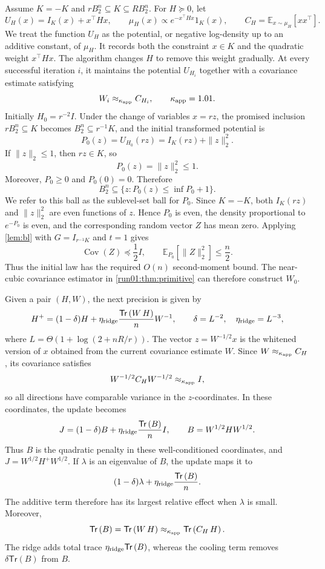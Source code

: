 \documentclass[11pt]{article}
\numberwithin{equation}{section}
\theoremstyle{definition}
\newcommand{\E}[2]{\mathbb{E}_{#1}\left[#2\right]}
\newcommand{\Tr}[1]{\mathsf{Tr}\left(#1\right)}
\begin{document}
Assume $K=-K$ and
$rB_2^n\subseteq K\subseteq RB_2^n$.
For $H\succeq0$, let
\[
U_H(x)=I_K(x)+x^\top Hx,
\qquad
\mu_H(x)\propto e^{-x^\top Hx}1_K(x),
\qquad
C_H=\E{x\sim\mu_H}{xx^\top}.
\]
We treat the function $U_H$ as the potential, or negative log-density up to an
additive constant, of
$\mu_H$.
It records both the constraint $x\in K$ and the quadratic weight
$x^\top Hx$.
The algorithm changes $H$ to remove this weight gradually.
At every successful iteration $i$, it maintains the potential
$U_{H_i}$ together with a covariance estimate satisfying
\[
W_i\approx_{\kappa_{\rm app}}C_{H_i},
\qquad
\kappa_{\rm app}=1.01.
\]
Initially $H_0=r^{-2}I$.
Under the change of variables $x=rz$, the promised inclusion
$rB_2^n\subseteq K$ becomes
$B_2^n\subseteq r^{-1}K$, and the initial transformed potential is
\[
P_0(z)
=U_{H_0}(rz)
=I_K(rz)+\|z\|_2^2.
\]
If $\|z\|_2\leq1$, then
$rz\in K$, so
\[
P_0(z)
=\|z\|_2^2
\leq1.
\]
Moreover, $P_0\geq0$ and
$P_0(0)=0$.
Therefore
\[
 B_2^n\subseteq\{z:P_0(z)\leq\inf P_0+1\}.
\]
We refer to this ball as the sublevel-set ball for $P_0$.
Since $K=-K$, both
$I_K(rz)$ and
$\|z\|_2^2$ are even functions of
$z$.
Hence $P_0$ is even, the density proportional to
$e^{-P_0}$ is even, and the corresponding random vector
$Z$ has mean zero.
Applying \cref{lem:bl} with $G=I_{r^{-1}K}$ and
$t=1$ gives
\[
\operatorname{Cov}(Z)\preceq\frac12I,
\qquad
\E{P_0}{\|Z\|_2^2}\leq\frac n2.
\]
Thus the initial law has the required $O(n)$ second-moment bound.
The near-cubic covariance estimator in \cref{run01:thm:primitive} can therefore
construct $W_0$.

Given a pair $(H,W)$, the next precision is given by
\[
H^+=(1-\delta)H+ \eta_{\rm ridge}\frac{\Tr{W\,H}}{n}W^{-1},
\qquad
\delta=L^{-2},
\quad
\eta_{\rm ridge}=L^{-3},
\]
where $L=\Theta(1+\log(2+nR/r))$.
The vector $z=W^{-1/2}x$ is the whitened version of
$x$ obtained from the current covariance estimate
$W$.
Since $W\approx_{\kappa_{\rm app}}C_H$, its covariance satisfies
\[
 W^{-1/2}C_HW^{-1/2}\approx_{\kappa_{\rm app}}I,
\]
so all directions have comparable variance in the $z$-coordinates.
In these coordinates, the update becomes
\[
J=(1-\delta)B+ \eta_{\rm ridge}\frac{\Tr{B}}{n}I,
\qquad
B=W^{1/2}HW^{1/2}.
\]
Thus $B$ is the quadratic penalty in these well-conditioned coordinates, and
$J=W^{1/2}H^+W^{1/2}$.
If $\lambda$ is an eigenvalue of
$B$, the update maps it to
\[
 (1-\delta)\lambda+
 \eta_{\rm ridge}\frac{\Tr{B}}{n}.
\]
The additive term therefore has its largest relative effect when $\lambda$ is
small.
Moreover,
\[
\Tr{B}
=\Tr{W\,H}
\approx_{\kappa_{\rm app}}\Tr{C_H\,H}.
\]
The ridge adds total trace $\eta_{\rm ridge}\Tr{B}$, whereas the cooling term
removes
$\delta\Tr{B}$ from
$B$.
\end{document}
